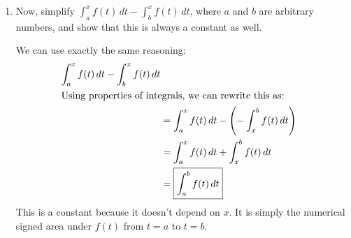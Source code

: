 \documentclass{article}
\begin{document}
\begin{enumerate}
\begin{enumerate}
    \begin{solution}
      \begin{align*}
         B(x) - A(x) &= \int_3^x f(t)\,dt - \int_0^x f(t)\,dt
        \\
        \intertext{Using properties of integrals, we can rewrite this as:}
        &= \int_3^x f(t)\,dt - \left( - \int_x^0 f(t)\,dt \right) \\
        &=\int_3^x f(t)\,dt + \int_x^0 f(t)\,dt  \\
        &= \boxed{\int_3^0 f(t)\,dt}
      \end{align*}
    \end{solution}

  \item
    \begin{problem}[\vfill]
      Now, simplify $\displaystyle \int_a^x f(t)\,dt - \int_b^x f(t)\,dt$, where $a$ and $b$ are
      arbitrary numbers, and show that this is always a constant as well.
    \end{problem}

    \begin{solution}
      We can use exactly the same reasoning:
      \begin{align*}
        \int_a^x f(t)\,dt - \int_b^x f(t)\,dt
        \\
        \intertext{Using properties of integrals, we can rewrite this as:}
        &= \int_a^x f(t)\,dt - \left( - \int_x^b f(t)\,dt \right) \\
        &=\int_a^x f(t)\,dt + \int_x^b f(t)\,dt  \\
        &= \boxed{\int_a^b f(t)\,dt}
      \end{align*}
      This is a constant because it doesn't depend on $x$. It is simply the numerical signed area under $f(t)$ from $t=a$ to $t=b$.
    \end{solution}

  \end{enumerate}
\end{enumerate}

\end{document}
